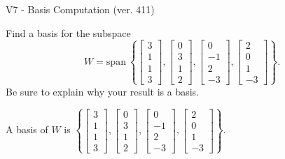 \begin{exercise}
  \begin{exerciseTitle}V7 - Basis Computation (ver. 411)\end{exerciseTitle}
  \begin{exerciseStatement}
    Find a basis for the subspace 
\[W=\mathrm{span}\ \left\{\left[\begin{array}{r}
3 \\
1 \\
1 \\
3
\end{array}\right] , \left[\begin{array}{r}
0 \\
3 \\
1 \\
2
\end{array}\right] , \left[\begin{array}{r}
0 \\
-1 \\
2 \\
-3
\end{array}\right] , \left[\begin{array}{r}
2 \\
0 \\
1 \\
-3
\end{array}\right]\right\}.\]
 Be sure to explain why your result is a basis.


  \end{exerciseStatement}
  \begin{exerciseAnswer}
   A basis of \(W\) is  \(\left\{\left[\begin{array}{r}
3 \\
1 \\
1 \\
3
\end{array}\right] , \left[\begin{array}{r}
0 \\
3 \\
1 \\
2
\end{array}\right] , \left[\begin{array}{r}
0 \\
-1 \\
2 \\
-3
\end{array}\right] , \left[\begin{array}{r}
2 \\
0 \\
1 \\
-3
\end{array}\right]\right\}\).
  


  \end{exerciseAnswer}
\end{exercise}